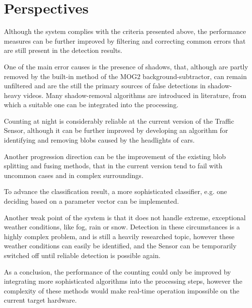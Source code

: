 \section{Perspectives}
Although the system complies with the criteria presented above, the performance measures can be further improved by filtering and correcting common errors that are still present in the detection results.

One of the main error causes is the presence of shadows, that, although are partly removed by the built-in method of the MOG2 background-subtractor, can remain unfiltered and are the still the primary sources of false detections in shadow-heavy videos.
Many shadow-removal algorithms are introduced in literature, from which a suitable one can be integrated into the processing.

Counting at night is considerably reliable at the current version of the Traffic Sensor, although it can be further improved by developing an algorithm for identifying and removing blobs caused by the headlights of cars.

Another progression direction can be the improvement of the existing blob splitting and fusing methods, that in the current version tend to fail with uncommon cases and in complex surroundings.

To advance the classification result, a more sophisticated classifier, e.g. one deciding based on a parameter vector can be implemented.

Another weak point of the system is that it does not handle extreme, exceptional weather conditions, like fog, rain or snow.
Detection in these circumstances is a highly complex problem, and is still a heavily researched topic, however these weather conditions can easily be identified, and the Sensor can be temporarily switched off until reliable detection is possible again.
	
As a conclusion, the performance of the counting could only be improved by integrating more sophisticated algorithms into the processing steps, however the complexity of these methods would make real-time operation impossible on the current target hardware.
